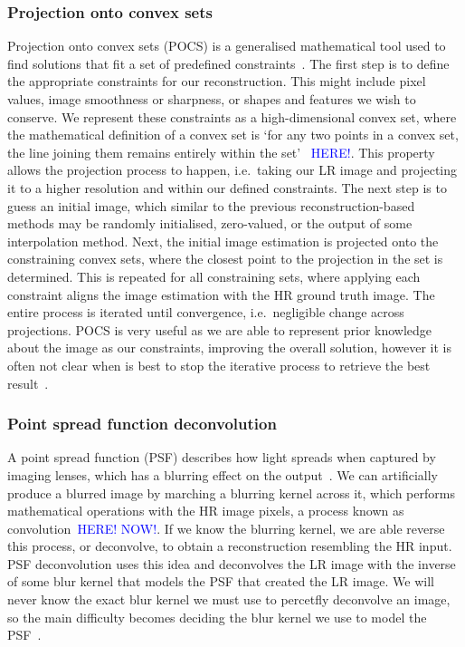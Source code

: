 \subsubsection{Projection onto convex sets}
Projection onto convex sets (POCS) is a generalised mathematical tool used to find solutions that fit a set of predefined constraints~\cite{pocs,pocsEndoscopy}. The first step is to define the appropriate constraints for our reconstruction. This might include pixel values, image smoothness or sharpness, or shapes and features we wish to conserve. We represent these constraints as a high-dimensional convex set, where the mathematical definition of a convex set is `for any two points in a convex set, the line joining them remains entirely within the set'~\cite{pocs,pocsEndoscopy} \textcolor{blue}{HERE!}. This property allows the projection process to happen, i.e.\ taking our LR image and projecting it to a higher resolution and within our defined constraints. The next step is to guess an initial image, which similar to the previous reconstruction-based methods may be randomly initialised, zero-valued, or the output of some interpolation method. Next, the initial image estimation is projected onto the constraining convex sets, where the closest point to the projection in the set is determined. This is repeated for all constraining sets, where applying each constraint aligns the image estimation with the HR ground truth image. The entire process is iterated until convergence, i.e.\ negligible change across projections. POCS is very useful as we are able to represent prior knowledge about the image as our constraints, improving the overall solution, however it is often not clear when is best to stop the iterative process to retrieve the best result~\cite{pocsEndoscopy}.

\subsubsection{Point spread function deconvolution}
A point spread function (PSF) describes how light spreads when captured by imaging lenses, which has a blurring effect on the output~\cite{psfDeconv}. We can artificially produce a blurred image by marching a blurring kernel across it, which performs mathematical operations with the HR image pixels, a process known as convolution~\cite{ref}\textcolor{blue}{HERE! NOW!}. If we know the blurring kernel, we are able reverse this process, or deconvolve, to obtain a reconstruction resembling the HR input. PSF deconvolution uses this idea and deconvolves the LR image with the inverse of some blur kernel that models the PSF that created the LR image. We will never know the exact blur kernel we must use to percetfly deconvolve an image, so the main difficulty becomes deciding the blur kernel we use to model the PSF~\cite{pocs}.

